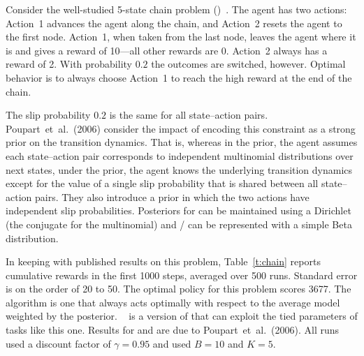 Consider the well-studied 5-state chain
problem ()~\cite{strens00,poupart06}.  The agent has two
actions: Action~1 advances the agent along the chain, and Action~2
resets the agent to the first node.  Action~1, when taken from the
last node, leaves the agent where it is and gives a reward of 10---all
other rewards are 0.  Action~2 always has a reward of 2.  With
probability $0.2$ the outcomes are switched, however.  Optimal
behavior is to always choose Action~1 to reach the high reward at the end
of the chain.


The slip probability $0.2$ is the same for all state--action pairs.
Poupart~et~al.~(2006) consider the impact of encoding this constraint
as a strong prior on the transition dynamics.  That is, whereas in the
 prior, the agent assumes each state--action pair corresponds
to independent multinomial distributions over next states, under the
 prior, the agent knows the underlying transition dynamics
except for the value of a single slip probability that is shared
between all state--action pairs.  They also introduce a  prior
in which the two actions have independent slip probabilities.
Posteriors for  can be maintained using a Dirichlet (the conjugate
for the multinomial) and / can be represented with a simple
Beta distribution.

In keeping with published results on this problem, Table~\ref{t:chain}
reports cumulative rewards in the first 1000 steps, averaged over 500
runs.  Standard error is on the order of 20 to 50.  The optimal policy
for this problem scores 3677.  The  algorithm is one that
always acts optimally with respect to the average model weighted by
the posterior.  ~\cite{leffler07} is a version of  that
can exploit the tied parameters of tasks like this one.  Results for
 and  are due to Poupart~et~al.~(2006).  All runs used a
discount factor of $\gamma=0.95$ and  used $B=10$ and $K=5$.

\begin{table}
\caption{Cumulative reward in ~\cite{asmuth09}}
\label{t:chain}
\end{table}

